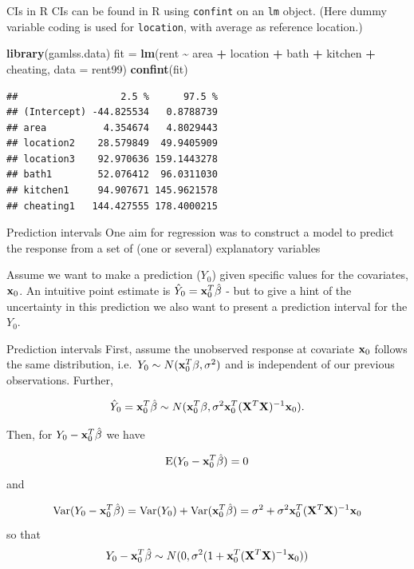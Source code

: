 \documentclass[
  ignorenonframetext,
]{beamer}
\newenvironment{Shaded}{\begin{snugshade}}{\end{snugshade}}
\newcommand{\AttributeTok}[1]{\textcolor[rgb]{0.13,0.29,0.53}{#1}}
\newcommand{\FunctionTok}[1]{\textcolor[rgb]{0.13,0.29,0.53}{\textbf{#1}}}
\newcommand{\NormalTok}[1]{#1}
\newcommand{\OtherTok}[1]{\textcolor[rgb]{0.56,0.35,0.01}{#1}}
\newcommand{\SpecialCharTok}[1]{\textcolor[rgb]{0.81,0.36,0.00}{\textbf{#1}}}
\begin{document}
\begin{frame}[fragile]{CIs in R}
\label{cis-in-r}
CIs can be found in R using \texttt{confint} on an \texttt{lm} object.
(Here dummy variable coding is used for \texttt{location}, with average
as reference location.)

\begin{Shaded}
\begin{Highlighting}[]
\FunctionTok{library}\NormalTok{(gamlss.data)}
\NormalTok{fit }\OtherTok{=} \FunctionTok{lm}\NormalTok{(rent }\SpecialCharTok{\textasciitilde{}}\NormalTok{ area }\SpecialCharTok{+}\NormalTok{ location }\SpecialCharTok{+}\NormalTok{ bath }\SpecialCharTok{+}\NormalTok{ kitchen }\SpecialCharTok{+}\NormalTok{ cheating, }\AttributeTok{data =}\NormalTok{ rent99)}
\FunctionTok{confint}\NormalTok{(fit)}
\end{Highlighting}
\end{Shaded}

\begin{verbatim}
##                  2.5 %      97.5 %
## (Intercept) -44.825534   0.8788739
## area          4.354674   4.8029443
## location2    28.579849  49.9405909
## location3    92.970636 159.1443278
## bath1        52.076412  96.0311030
## kitchen1     94.907671 145.9621578
## cheating1   144.427555 178.4000215
\end{verbatim}
\end{frame}

\begin{frame}{Prediction intervals}
\label{prediction-intervals}
One aim for regression was to construct a model to predict the response
from a set of (one or several) explanatory variables

Assume we want to make a prediction (\(Y_0\)) given specific values for
the covariates, \({\bf x}_0\). An intuitive point estimate is
\(\hat{Y}_0={\bf x}_0^T \hat{\beta}\) - but to give a hint of the
uncertainty in this prediction we also want to present a prediction
interval for the \(Y_0\).
\end{frame}

\begin{frame}{Prediction intervals}
\label{prediction-intervals-1}
First, assume the unobserved response at covariate \({\bf x}_0\) follows
the same distribution, i.e.~\(Y_0 \sim N({\bf x}_0^T \beta,\sigma^2)\)
and is independent of our previous observations. Further,

\[\hat{Y}_0={\bf x}_0^T \hat{\beta} \sim N({\bf x}_0^T \beta,\sigma^2 {\bf x}_0^T({\bf X}^T{\bf X})^{-1}{\bf x}_0).\]

Then, for \(Y_0-{\bf x}_0^T \hat{\beta}\) we have

\[\text{E}(Y_0-{\bf x}_0^T \hat{\beta})=0\] and

\[\text{Var}(Y_0-{\bf x}_0^T \hat{\beta})=\text{Var}(Y_0)+\text{Var}({\bf x}_0^T \hat{\beta})=\sigma^2+\sigma^2{\bf x}_0^T({\bf X}^T{\bf X})^{-1}{\bf x}_0\]
so that
\[Y_0-{\bf x}_0^T \hat{\beta}\sim N(0,\sigma^2 (1+{\bf x}_0^T({\bf X}^T{\bf X})^{-1}{\bf x}_0)) \]
\end{frame}
\end{document}
